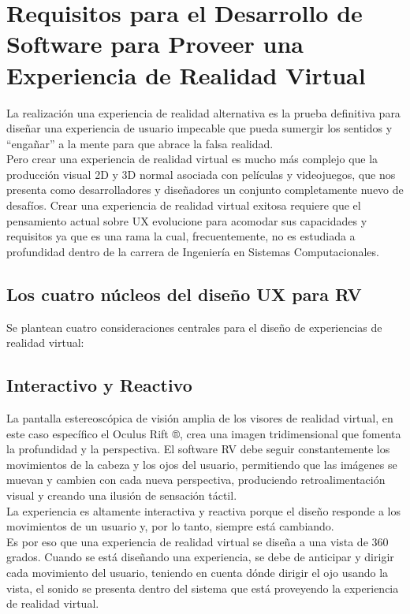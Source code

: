 \section{Requisitos para el Desarrollo de Software para Proveer una Experiencia de Realidad Virtual}
La realización una experiencia de realidad alternativa es la prueba definitiva para diseñar una experiencia de usuario impecable que pueda sumergir los sentidos y 
“engañar” a la mente para que abrace la falsa realidad. \\
Pero crear una experiencia de realidad virtual es mucho más complejo que la producción visual 2D y 3D normal asociada con películas y videojuegos, que nos presenta 
como desarrolladores y diseñadores un conjunto completamente nuevo de desafíos. Crear una experiencia de realidad virtual exitosa requiere que el pensamiento actual 
sobre UX evolucione para acomodar sus capacidades y requisitos ya que es una rama la cual, frecuentemente, no es estudiada a profundidad dentro de la carrera de 
Ingeniería en Sistemas Computacionales. 

\subsection{Los cuatro núcleos del diseño UX para RV}
Se plantean cuatro consideraciones centrales para el diseño de experiencias de realidad virtual:\\

\subsection{Interactivo y Reactivo}
La pantalla estereoscópica de visión amplia de los visores de realidad virtual, en este caso específico el Oculus Rift ®,  crea una imagen tridimensional que fomenta 
la profundidad y la perspectiva. El software RV debe seguir constantemente los movimientos de la cabeza y los ojos del usuario, permitiendo que las imágenes se muevan 
y cambien con cada nueva perspectiva, produciendo retroalimentación visual y creando una ilusión de sensación táctil.\\
La experiencia es altamente interactiva y reactiva porque el diseño responde a los movimientos de un usuario y, por lo tanto, siempre está cambiando.\\
Es por eso que una experiencia de realidad virtual se diseña a una vista de 360 grados. Cuando se está diseñando una experiencia, se debe de anticipar y dirigir cada 
movimiento del usuario, teniendo en cuenta dónde dirigir el ojo usando la vista, el sonido se presenta dentro del sistema que está proveyendo la experiencia de realidad virtual.

